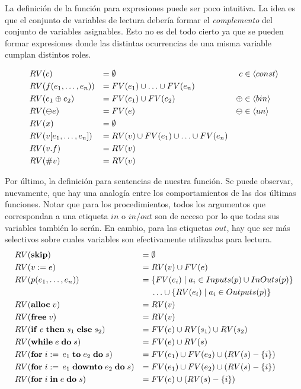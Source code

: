 \documentclass{article}
\begin{document}
La definición de la función para expresiones puede ser poco intuitiva.
La idea es que el conjunto de variables de lectura debería formar el \textit{complemento} del conjunto de variables asignables.
Esto no es del todo cierto ya que se pueden formar expresiones donde las distintas ocurrencias de una misma variable cumplan distintos roles.


\begin{align*}
&RV(c)
&=&\;
\emptyset
&c &\in \langle const \rangle
\\
&RV(f(e_1, \ldots, e_n))
&=&\;
FV(e_1) \cup \ldots \cup FV(e_n)
\\
&RV(e_1 \oplus e_2)
&=&\;
FV(e_1) \cup FV(e_2)
&\oplus &\in \langle bin \rangle
\\
&RV(\ominus e)
&=&\;
FV(e)
&\ominus &\in \langle un \rangle
\\
&RV(x)
&=&\;
\emptyset
\\
&RV(v [e_1, \ldots, e_n])
&=&\;
RV(v) \cup FV(e_1) \cup \ldots \cup FV(e_n)
\\
&RV(v.f)
&=&\;
RV(v)
\\
&RV(\# v)
&=&\;
RV(v)
\end{align*}

Por último, la definición para sentencias de nuestra función.
Se puede observar, nuevamente, que hay una analogía entre los comportamientos de las dos últimas funciones.
Notar que para los procedimientos, todos los argumentos que correspondan a una etiqueta $in$ o $in/out$ son de acceso por lo que todas sus variables también lo serán.
En cambio, para las etiquetas $out$, hay que ser más selectivos sobre cuales variables son efectivamente utilizadas para lectura.
\begin{align*}
&RV(\mathbf{skip})
&=&\;
\emptyset
\\
&RV(v := e)
&=&\;
RV(v) \cup FV(e)
\\
&RV(p(e_1, \ldots, e_n))
&=&\;
\{ FV(e_i) \mid a_i \in Inputs(p) \cup InOuts(p) \}
\\
&&&
\;\ldots\cup
\{ RV(e_i) \mid a_i \in Outputs(p) \}
\\
&RV(\mathbf{alloc} \; v)
&=&\;
RV(v)
\\
&RV(\mathbf{free} \; v)
&=&\;
RV(v)
\\
&RV(\mathbf{if} \; e \; \mathbf{then} \; s_1 \; \mathbf{else} \; s_2)
&=&\;
FV(e) \cup RV(s_1) \cup RV(s_2)
\\
&RV(\mathbf{while} \; e \; \mathbf{do} \; s)
&=&\;
FV(e) \cup RV(s)
\\
&RV(\mathbf{for} \; i := \, e_1 \; \mathbf{to} \; e_2 \; \mathbf{do} \; s)
&=&\;
FV(e_1) \cup FV(e_2) \cup (RV(s) - \{ i \})
\\
&RV(\mathbf{for} \; i := \, e_1 \; \mathbf{downto} \; e_2 \; \mathbf{do} \; s)
&=&\;
FV(e_1) \cup FV(e_2) \cup (RV(s) - \{ i \})
\\
&RV(\mathbf{for} \; i \; \mathbf{in} \; e \; \mathbf{do} \; s)
&=&\;
FV(e) \cup (RV(s) - \{ i \})
\end{align*}
\end{document}
